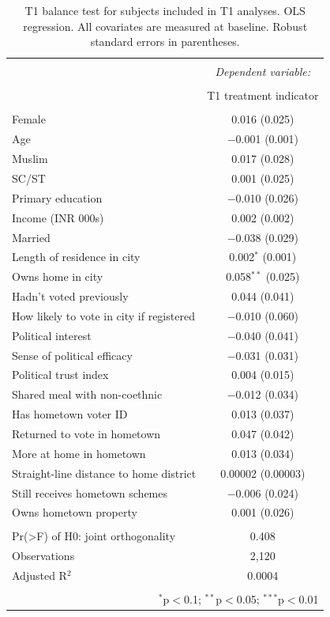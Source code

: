 \documentclass[
  11.5pt,
]{article}
\begin{document}
\begin{table}[!htbp] \centering 
  \caption{T1 balance test for subjects included in T1 analyses. OLS regression. All covariates are measured at baseline. Robust standard errors in parentheses.} 
  \label{} 
\small 
\begin{tabular}{@{\extracolsep{5pt}}lc} 
\\[-1.8ex]\hline 
\hline \\[-1.8ex] 
 & \multicolumn{1}{c}{\textit{Dependent variable:}} \\ 
\cline{2-2} 
\\[-1.8ex] & T1 treatment indicator \\ 
\hline \\[-1.8ex] 
 Female & 0.016 (0.025) \\ 
  Age & $-$0.001 (0.001) \\ 
  Muslim & 0.017 (0.028) \\ 
  SC/ST & 0.001 (0.025) \\ 
  Primary education & $-$0.010 (0.026) \\ 
  Income (INR 000s) & 0.002 (0.002) \\ 
  Married & $-$0.038 (0.029) \\ 
  Length of residence in city & 0.002$^{*}$ (0.001) \\ 
  Owns home in city & 0.058$^{**}$ (0.025) \\ 
  Hadn't voted previously & 0.044 (0.041) \\ 
  How likely to vote in city if registered & $-$0.010 (0.060) \\ 
  Political interest & $-$0.040 (0.041) \\ 
  Sense of political efficacy & $-$0.031 (0.031) \\ 
  Political trust index & 0.004 (0.015) \\ 
  Shared meal with non-coethnic & $-$0.012 (0.034) \\ 
  Has hometown voter ID & 0.013 (0.037) \\ 
  Returned to vote in hometown & 0.047 (0.042) \\ 
  More at home in hometown & 0.013 (0.034) \\ 
  Straight-line distance to home district & 0.00002 (0.00003) \\ 
  Still receives hometown schemes & $-$0.006 (0.024) \\ 
  Owns hometown property & 0.001 (0.026) \\ 
 \hline \\[-1.8ex] 
Pr(>F) of H0: joint orthogonality & 0.408 \\ 
Observations & 2,120 \\ 
Adjusted R$^{2}$ & 0.0004 \\ 
\hline 
\hline \\[-1.8ex] 
\multicolumn{2}{r}{$^{*}$p$<$0.1; $^{**}$p$<$0.05; $^{***}$p$<$0.01} \\ 
\end{tabular} 
\end{table}
\end{document}
